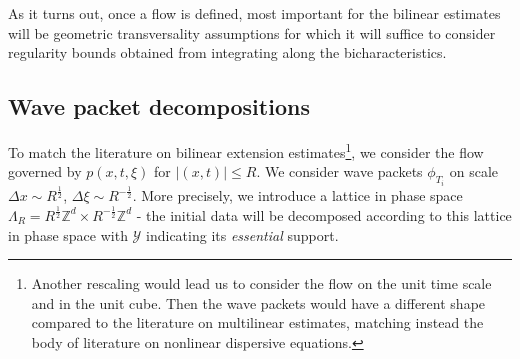 \documentclass{amsart}
\theoremstyle{definition}
\newcommand{\Z}{\mathbb{Z}}
\begin{document}
\smallskip

As it turns out, once a flow is defined, most important for the bilinear estimates
will be geometric transversality assumptions for which it will suffice to consider regularity bounds obtained from integrating along the bicharacteristics.

\subsection{Wave packet decompositions}

To match the literature on bilinear extension estimates\footnote{Another rescaling would lead us to consider the flow on the unit time scale and in the unit cube. Then the wave packets would have a different shape compared to the literature on multilinear estimates, matching instead the body of literature on nonlinear dispersive equations.}, we consider the flow governed by $p(x,t,\xi)$ for $|(x,t)| \leq R$. We consider wave packets $\phi_{T_i}$ on scale $\Delta x \sim R^{\frac{1}{2}}$, $\Delta \xi \sim R^{-\frac{1}{2}}$. More precisely, we introduce a lattice in phase space $\Lambda_R =  R^{\frac{1}{2}} \Z^d \times R^{-\frac{1}{2}} \Z^d $ - the initial data will be decomposed according to this lattice in phase space with $\mathcal{Y}$ indicating its \emph{essential} support.
\end{document}
